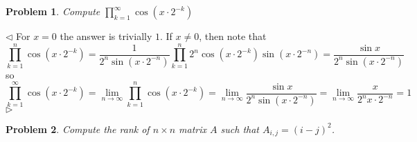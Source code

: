 \documentclass[12pt]{article}
\newtheorem{problem}{Problem}[subsection]
\newenvironment{solution}{\par $\triangleleft$}{$\triangleright$}
\begin{document}
\begin{problem} Compute $\prod_{k=1}^\infty \cos(x\cdot 2^{-k})$
\end{problem}
\begin{solution} For $x=0$ the answer is trivially $1$. If $x\neq 0$, then note
    that
    $$
        \prod_{k=1}^n \cos(x\cdot 2^{-k})
        =\frac{1}{2^n\sin(x\cdot 2^{-n})}
        \prod_{k=1}^n 2^n\cos(x\cdot 2^{-k})\sin(x\cdot 2^{-n})
        =\frac{\sin x}{2^n\sin(x\cdot 2^{-n})}
    $$
    so
    $$
        \prod_{k=1}^\infty \cos(x\cdot 2^{-k})
        =\lim\limits_{n\to\infty}\prod_{k=1}^n \cos(x\cdot 2^{-k})
        =\lim\limits_{n\to\infty}\frac{\sin x}{2^n\sin(x\cdot 2^{-n})}
        =\lim\limits_{n\to\infty}\frac{x}{2^n x\cdot 2^{-n}}=1
    $$
\end{solution}

\begin{problem} Compute the rank of $n\times n$ matrix $A$ such that
$A_{i,j}={(i-j)}^2$.
\end{problem}
\end{document}
